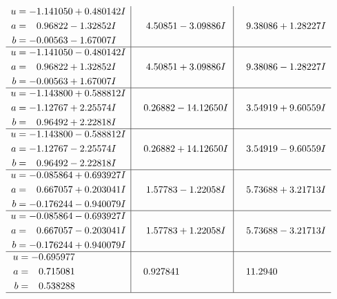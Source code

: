 \documentclass[1p]{elsarticle_modified}
\theoremstyle{definition}
\begin{document}
$$\begin{array}{c|c|c}
\begin{aligned}
u &= -1.141050 + 0.480142 I \\
a &= \phantom{-}0.96822 - 1.32852 I \\
b &= -0.00563 - 1.67007 I\end{aligned}
 & \phantom{-}4.50851 - 3.09886 I & \phantom{-}9.38086 + 1.28227 I \\ \hline\begin{aligned}
u &= -1.141050 - 0.480142 I \\
a &= \phantom{-}0.96822 + 1.32852 I \\
b &= -0.00563 + 1.67007 I\end{aligned}
 & \phantom{-}4.50851 + 3.09886 I & \phantom{-}9.38086 - 1.28227 I \\ \hline\begin{aligned}
u &= -1.143800 + 0.588812 I \\
a &= -1.12767 + 2.25574 I \\
b &= \phantom{-}0.96492 + 2.22818 I\end{aligned}
 & \phantom{-}0.26882 - 14.12650 I & \phantom{-}3.54919 + 9.60559 I \\ \hline\begin{aligned}
u &= -1.143800 - 0.588812 I \\
a &= -1.12767 - 2.25574 I \\
b &= \phantom{-}0.96492 - 2.22818 I\end{aligned}
 & \phantom{-}0.26882 + 14.12650 I & \phantom{-}3.54919 - 9.60559 I \\ \hline\begin{aligned}
u &= -0.085864 + 0.693927 I \\
a &= \phantom{-}0.667057 + 0.203041 I \\
b &= -0.176244 - 0.940079 I\end{aligned}
 & \phantom{-}1.57783 - 1.22058 I & \phantom{-}5.73688 + 3.21713 I \\ \hline\begin{aligned}
u &= -0.085864 - 0.693927 I \\
a &= \phantom{-}0.667057 - 0.203041 I \\
b &= -0.176244 + 0.940079 I\end{aligned}
 & \phantom{-}1.57783 + 1.22058 I & \phantom{-}5.73688 - 3.21713 I \\ \hline\begin{aligned}
u &= -0.695977\phantom{ +0.000000I} \\
a &= \phantom{-}0.715081\phantom{ +0.000000I} \\
b &= \phantom{-}0.538288\phantom{ +0.000000I}\end{aligned}
 & \phantom{-}0.927841\phantom{ +0.000000I} & \phantom{-}11.2940\phantom{ +0.000000I}\\
 \hline 
 \end{array}$$\newpage\newpage\renewcommand{\arraystretch}{1}
\end{document}
